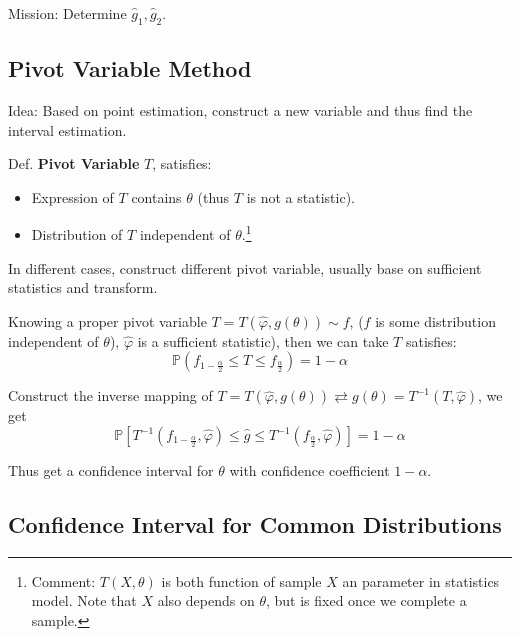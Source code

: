     Mission: Determine $\hat{g}_1,\hat{g}_2$.


\subsection{Pivot Variable Method}\label{SubSectionPivotVariableMethod}
    Idea: Based on point estimation, construct a new variable and thus find the interval estimation.

    Def. \textbf{Pivot Variable} $T$, satisfies: 
    \begin{itemize}[topsep=2pt,itemsep=0pt]
        \item Expression of $T$ contains $\theta$ (thus $T$ is not a statistic).
        \item Distribution of $T$ independent of $\theta$.\footnote{Comment: $ T(X,\theta ) $ is both function of sample $ X $ an parameter in statistics model. Note that $ X $ also depends on $ \theta  $, but is fixed once we complete a sample.}
    \end{itemize}

    In different cases, construct different pivot variable, usually base on sufficient statistics and transform.
    
    Knowing a proper pivot variable $T=T(\hat{\varphi},g(\theta))\sim f$, ($f$ is some distribution independent of $\theta$), $\hat{\varphi}$ is a sufficient statistic), then we can take $T$ satisfies:
    \begin{equation}
        \mathbb{P}(f_{1-\frac{\alpha}{2}}\leq T\leq f_{\frac{\alpha}{2}})=1-\alpha
    \end{equation}

    Construct the inverse mapping of $T=T(\hat{\varphi},g(\theta))\rightleftarrows g(\theta)=T^{-1}(T,\hat{\varphi})$, we get
    \begin{equation}
        \mathbb{P}[T^{-1}(f_{1-\frac{\alpha}{2}},\hat{\varphi})\leq\hat{g}\leq T^{-1}(f_{\frac{\alpha}{2}},\hat{\varphi})]=1-\alpha
    \end{equation}
    
    Thus get a confidence interval for $\theta$ with confidence coefficient $1-\alpha$.\\


\subsection{Confidence Interval for Common Distributions}\label{SubSectionConfidenceIntervalForDistributions}

